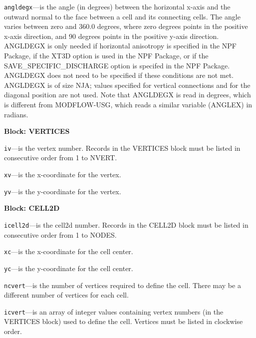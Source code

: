 \begin{description}
\item \texttt{angldegx}---is the angle (in degrees) between the horizontal x-axis and the outward normal to the face between a cell and its connecting cells. The angle varies between zero and 360.0 degrees, where zero degrees points in the positive x-axis direction, and 90 degrees points in the positive y-axis direction.  ANGLDEGX is only needed if horizontal anisotropy is specified in the NPF Package, if the XT3D option is used in the NPF Package, or if the SAVE\_SPECIFIC\_DISCHARGE option is specifed in the NPF Package.  ANGLDEGX does not need to be specified if these conditions are not met.  ANGLDEGX is of size NJA; values specified for vertical connections and for the diagonal position are not used.  Note that ANGLDEGX is read in degrees, which is different from MODFLOW-USG, which reads a similar variable (ANGLEX) in radians.

\end{description}
\item \textbf{Block: VERTICES}

\begin{description}
\item \texttt{iv}---is the vertex number.  Records in the VERTICES block must be listed in consecutive order from 1 to NVERT.

\item \texttt{xv}---is the x-coordinate for the vertex.

\item \texttt{yv}---is the y-coordinate for the vertex.

\end{description}
\item \textbf{Block: CELL2D}

\begin{description}
\item \texttt{icell2d}---is the cell2d number.  Records in the CELL2D block must be listed in consecutive order from 1 to NODES.

\item \texttt{xc}---is the x-coordinate for the cell center.

\item \texttt{yc}---is the y-coordinate for the cell center.

\item \texttt{ncvert}---is the number of vertices required to define the cell.  There may be a different number of vertices for each cell.

\item \texttt{icvert}---is an array of integer values containing vertex numbers (in the VERTICES block) used to define the cell.  Vertices must be listed in clockwise order.

\end{description}

